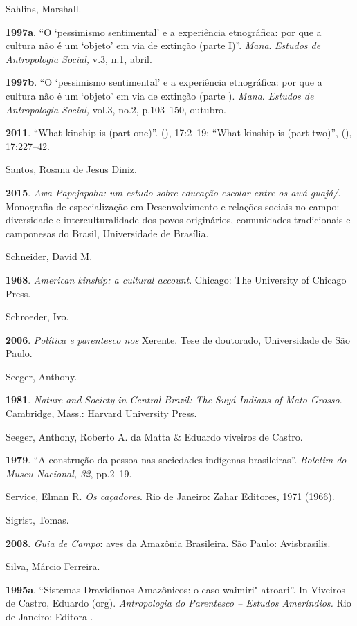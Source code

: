 \begin{Parskip}
Sahlins, Marshall.

\textbf{1997a}. ``O `pessimismo sentimental' e a experiência
etnográfica: por que a cultura não é um `objeto' em via de extinção
(parte I)''. \emph{Mana}. \emph{Estudos de Antropologia Social,} v.3,
n.1, abril.

\textbf{1997b}. ``O `pessimismo sentimental' e a experiência
etnográfica: por que a cultura não é um `objeto' em via de extinção
(parte ). \emph{Mana}. \emph{Estudos de Antropologia Social,} vol.3,
no.2, p.103--150, outubro.

\textbf{2011}. ``What kinship is (part one)''.  (), 17:2--19;
``What kinship is (part two)'',  (), 17:227--42.

Santos, Rosana de Jesus Diniz.

\textbf{2015}. \emph{Awa Papejapoha: um estudo sobre educação escolar
entre os awá guajá/}. Monografia de especialização em Desenvolvimento
e relações sociais no campo: diversidade e interculturalidade dos povos
originários, comunidades tradicionais e camponesas do Brasil,
Universidade de Brasília.

Schneider, David M.

\textbf{1968}. \emph{American kinship: a cultural account}. Chicago: The
University of Chicago Press.

Schroeder, Ivo.

\textbf{2006}. \emph{Política e parentesco nos} Xerente. Tese de
doutorado, Universidade de São Paulo.

Seeger, Anthony.

\textbf{1981}. \emph{Nature and Society in Central Brazil: The Suyá
Indians of Mato Grosso}. Cambridge, Mass.: Harvard University Press.

Seeger, Anthony, Roberto A. da Matta \& Eduardo viveiros de Castro.

\textbf{1979}. ``A construção da pessoa nas sociedades indígenas
brasileiras''. \emph{Boletim do Museu Nacional, 32}, pp.2--19.

Service, Elman R. \emph{Os caçadores}. Rio de Janeiro: Zahar Editores,
1971 (1966).

Sigrist, Tomas.

\textbf{2008}. \emph{Guia de Campo}: aves da Amazônia Brasileira. São
Paulo: Avisbrasilis.

Silva, Márcio Ferreira.

\textbf{1995a}. ``Sistemas Dravidianos Amazônicos: o caso
waimiri"-atroari''. In Viveiros de Castro, Eduardo (org).
\emph{Antropologia do Parentesco -- Estudos Ameríndios.} Rio de Janeiro:
Editora .


\end{Parskip}

